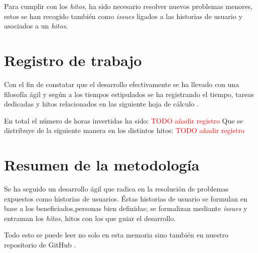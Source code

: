 Para cumplir con los \textit{hitos},  ha sido necesario resolver nuevos  problemas menores, estos se han
recogido también como \textit{issues} ligados a las historias de usuario y asociados a un  \textit{hitos}.

\section{Registro de trabajo}  

Con el fin de constatar que el desarrollo efectivamente se ha 
llevado con una filosofía ágil y según a los tiempos estipulados se ha registrando el tiempo, tareas dedicadas  y hitos relacionados
en las siguiente hoja de cálculo \cite{TFG-hoja-calculo-horas-trabajo}.

En total el número de horas invertidas ha sido: 
\textcolor{red}{TODO añadir registro}
Que se distribuye de la siguiente manera en los distintos hitos: 
\textcolor{red}{TODO añadir registro}


\section{Resumen de la metodología}  

Se ha seguido un desarrollo ágil que radica en la resolución de problemas expuestos como historias de usuarios. 
Éstas historias de usuario se formulan en base a los beneficiados,personas bien definidas; se formalizan 
mediante \textit{issues} y entraman los \textit{hitos}, hitos con los que guiar el desarrollo.

Todo esto se puede leer no solo en esta memoria sino también en nuestro repositorio de GitHub \cite{TFG-Estudio-de-las-redes-neuronales}. 
 




